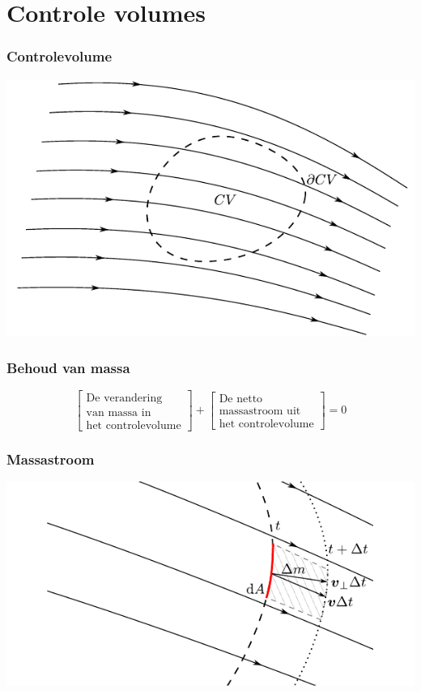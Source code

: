 \documentclass[t]{beamer}
\begin{document}
  	\section{Controle volumes}	
  		\begin{frame}
			\frametitle{Controlevolume}
			\center
			\includegraphics{fig/controlevolumes/Controlevolume_met_stroomlijnen}
  		\end{frame}
  		\begin{frame}
			\frametitle{Behoud van massa}
			\vspace{2cm}
			\begin{equation*}
				\left[
					\begin{array}{c}
						\mbox{De verandering} \\ \mbox{van massa in} \\ \mbox{het controlevolume}
					\end{array}
				\right]
				+
				\left[
					\begin{array}{c}
						\mbox{De netto} \\ \mbox{massastroom uit} \\ \mbox{het controlevolume}
					\end{array}
				\right]
				= 0
			\end{equation*}
		\end{frame}	
		\begin{frame}
			\frametitle{Massastroom}
			\vspace{1cm}
			\center
			\includegraphics{fig/controlevolumes/massastroom}
  		\end{frame}
\end{document}
